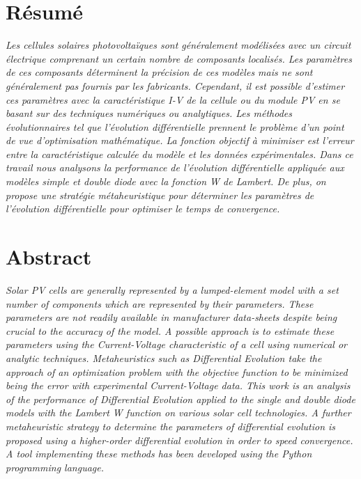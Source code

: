 \section*{Résumé}
\textit{Les cellules solaires photovoltaïques sont généralement modélisées avec un circuit électrique comprenant un certain nombre de composants localisés. Les paramètres de ces composants déterminent la précision de ces modèles mais ne sont généralement pas fournis par les fabricants. Cependant, il est possible d'estimer ces paramètres avec la caractéristique I-V de la cellule ou du module PV en se basant sur des techniques numériques ou analytiques. Les méthodes évolutionnaires tel que l'évolution différentielle prennent le problème d'un point de vue d'optimisation mathématique. La fonction objectif à minimiser est l'erreur entre la caractéristique calculée du modèle et les données expérimentales. Dans ce travail nous analysons la performance de l'évolution différentielle appliquée aux modèles simple et double diode avec la fonction W de Lambert. De plus, on propose une stratégie métaheuristique pour déterminer les paramètres de l'évolution différentielle pour optimiser le temps de convergence.
}
\section*{Abstract}
\textit{Solar PV cells are generally represented by a lumped-element model with a set number of components which are represented by their parameters. These parameters are not readily available in manufacturer data-sheets despite being crucial to the accuracy of the model. A possible approach is to estimate these parameters using the Current-Voltage characteristic of a cell using numerical or analytic techniques. Metaheuristics such as Differential Evolution take the approach of an optimization problem with the objective function to be minimized being the error with experimental Current-Voltage data. This work is an analysis of the performance of Differential Evolution applied to the single and double diode models with the Lambert W function on various solar cell technologies. A further metaheuristic strategy to determine the parameters of differential evolution is proposed using a higher-order differential evolution in order to speed convergence. A tool implementing these methods has been developed using the Python programming language.}


\printnomenclature


